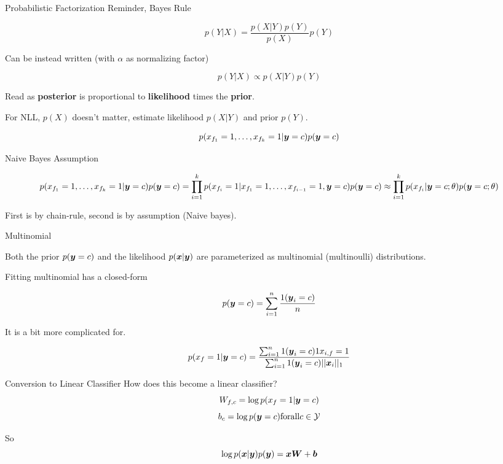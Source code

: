 \documentclass{beamer}
\begin{document}
\begin{frame}{Probabilistic Factorization} 
  Reminder, Bayes Rule

  \[ p(Y | X) = \frac{p(X | Y) p(Y)}{p(X)}{p(Y)} \] 

  Can be instead written (with $\alpha$ as normalizing factor) 

  \[ p(Y | X) \propto p(X | Y) p(Y) \] 

  Read as \textbf{posterior} is proportional to \textbf{likelihood} times 
  the \textbf{prior}.

  For NLL, $p(X)$ doesn't matter, estimate likelihood $p(X | Y)$ and
  prior $p(Y)$.
  
  \[p(x_{f_1}=1, \ldots, x_{f_k}=1 | \boldsymbol{y}=c ) p(\boldsymbol{y}=c)\]

\end{frame}


\begin{frame}{Naive Bayes Assumption} 

  \[ p(x_{f_1}=1, \ldots, x_{f_k}=1 | \boldy=c ) p(\boldy=c) = \prod_{i=1}^k p(x_{f_i}=1 | x_{f_1}=1, \ldots, x_{f_{i-1}}=1, \boldy=c) p(\boldy=c)  

  \approx \prod_{i=1}^k p(x_{f_i} | \boldy = c;\theta) p(\boldy=c; \theta)  
  \] 
  
  First is by chain-rule, second is by assumption (Naive bayes). 

\end{frame}

\begin{frame}{Multinomial} 
  
  Both the prior $p(\boldsymbol{y} = c)$ and the likelihood $p(\boldsymbol{x} | \boldsymbol{y})$ are
  parameterized as multinomial (multinoulli) distributions.

  Fitting multinomial has a closed-form

  \[ p(\boldsymbol{y}=c) = \sum_{i = 1}^n \frac{1(\boldsymbol{y}_i = c)}{n} \] 
  
  It is a bit more complicated for.

  \[p(x_f = 1 | \boldsymbol{y}=c) = \frac{\sum_{i = 1}^n 1(\boldsymbol{y}_i = c) 1{x_{i,f} = 1}}{\sum_{i = 1}^n 1(\boldsymbol{y}_i = c) ||\boldsymbol{x}_i ||_1}  \] 
\end{frame}


\begin{frame}{Conversion to Linear Classifier}
  How does this become a linear classifier? 
  \[ W_{f, c} =  \log p(x_f = 1 | \boldsymbol{y}=c)  \] 
  \[ b_c = \log p(\boldsymbol{y}=c)  \mathrm{ for all  }c\in \mathcal{Y} \] 

  So 
  \[\log p(\boldsymbol{x} | \boldsymbol{y}) p(\boldsymbol{y}) =  \boldsymbol{x} \boldsymbol{W} + \boldsymbol{b}  \]
\end{frame}
\end{document}
